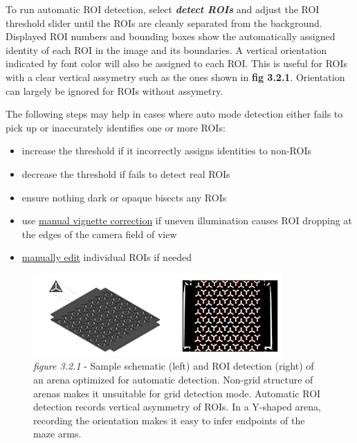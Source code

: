 \documentclass[11pt]{article}
\begin{document}
To run automatic ROI detection, select \textbf{\textit{detect ROIs}} and adjust the ROI threshold slider until the ROIs are cleanly separated from the background. Displayed ROI numbers and bounding boxes show the automatically assigned identity of each ROI in the image and its boundaries. A vertical orientation indicated by font color will also be assigned to each ROI. This is useful for ROIs with a clear vertical assymetry such as the ones shown in \textbf{fig 3.2.1}. Orientation can largely be ignored for ROIs without assymetry.

The following steps may help in cases where auto mode detection either fails to pick up or inaccurately identifies one or more ROIs:

\begin{itemize}
	\itemsep0em 
	\item increase the threshold if it incorrectly assigns identities to non-ROIs
	\item decrease the threshold if fails to detect real ROIs
	\item ensure nothing dark or opaque bisects any ROIs
	\item use \hyperlink{vignettecorrection}{manual vignette correction} if uneven illumination causes ROI dropping at the edges of the camera field of view
	\item \hyperlink{ROIediting}{manually edit} individual ROIs if needed
\end{itemize}

\begin{figure}[h!]
	\begin{center}
		\includegraphics[width=0.85\textwidth]{images/Starting a New Experiment/ymaze_96mazes_isometric.pdf}
		\caption*{\footnotesize {\textit{figure 3.2.1} - Sample schematic (left) and ROI detection (right) of an arena optimized for automatic detection. Non-grid structure of arenas makes it unsuitable for grid detection mode. Automatic ROI detection records vertical asymmetry of ROIs. In a Y-shaped arena, recording the orientation makes it easy to infer endpoints of the maze arms.}}
	\end{center}
\end{figure}
\end{document}
